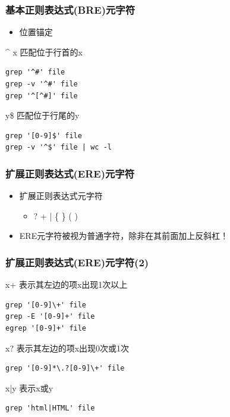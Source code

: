 \documentclass[xcolor=svgnames,presentation]{beamer}
\begin{document}
\begin{frame}[fragile]
\frametitle{基本正则表达式(BRE)元字符}
\label{sec-1-1-3}
\begin{itemize}

\item 位置锚定
\label{sec-1-1-3-1}%
\end{itemize} %
\begin{exampleblock}{\^{} x 匹配位于行首的x}
\label{sec-1-1-3-2}


\begin{verbatim}
grep '^#' file
grep -v '^#' file
grep '^[^#]' file
\end{verbatim}
\end{exampleblock}
\begin{block}{y\$ 匹配位于行尾的y}
\label{sec-1-1-3-3}


\begin{verbatim}
grep '[0-9]$' file
grep -v '^$' file | wc -l
\end{verbatim}
\end{block}
\end{frame}
\begin{frame}
\frametitle{扩展正则表达式(ERE)元字符}
\label{sec-1-1-4}
\begin{itemize}

\item 扩展正则表达式元字符
\label{sec-1-1-4-1}%
\begin{itemize}

\item ? + | \{ \} ( )
\label{sec-1-1-4-1-1}%
\end{itemize} %

\item ERE元字符被视为普通字符，除非在其前面加上反斜杠！
\label{sec-1-1-4-2}%
\end{itemize} %
\end{frame}
\begin{frame}[fragile]
\frametitle{扩展正则表达式(ERE)元字符(2)}
\label{sec-1-1-5}
\begin{exampleblock}{x+ 表示其左边的项x出现1次以上}
\label{sec-1-1-5-1}


\begin{verbatim}
grep '[0-9]\+' file
grep -E '[0-9]+' file
egrep '[0-9]+' file
\end{verbatim}
\end{exampleblock}
\begin{block}{x? 表示其左边的项x出现0次或1次}
\label{sec-1-1-5-2}


\begin{verbatim}
grep '[0-9]*\.?[0-9]\+' file
\end{verbatim}
\end{block}
\begin{exampleblock}{x|y 表示x或y}
\label{sec-1-1-5-3}


\begin{verbatim}
grep 'html|HTML' file
\end{verbatim}
\end{exampleblock}
\end{frame}
\end{document}
